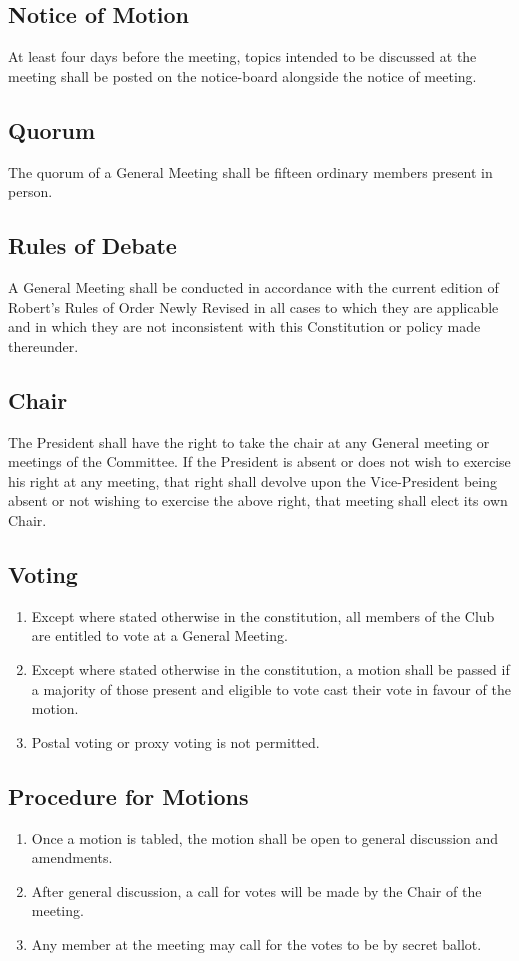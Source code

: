 \documentclass[11pt]{article} %
\begin{document}
\subsection{Notice of Motion}
At least four days before the meeting, topics intended to be discussed at the meeting shall be posted on the notice-board alongside the notice of meeting.
\subsection{Quorum}
The quorum of a General Meeting shall be fifteen ordinary members present in person.
\subsection{Rules of Debate}
A General Meeting shall be conducted in accordance with the current edition of Robert’s Rules of Order Newly Revised in all cases to which they are applicable and in which they are not inconsistent with this Constitution or policy made thereunder.
\subsection{Chair}
The President shall have the right to take the chair at any General meeting or meetings of the Committee. If the President is absent or does not wish to exercise his right at any meeting, that right shall devolve upon the Vice-President being absent or not wishing to exercise the above right, that meeting shall elect its own Chair.
\subsection{Voting}
\begin{enumerate}
	\item Except where stated otherwise in the constitution, all members of the Club are entitled to vote at a General Meeting.
	\item Except where stated otherwise in the constitution, a motion shall be passed if a majority of those present and eligible to vote cast their vote in favour of the motion.
	\item Postal voting or proxy voting is not permitted.
\end{enumerate}
\subsection{Procedure for Motions}
\begin{enumerate}
	\item Once a motion is tabled, the motion shall be open to general discussion and amendments.
	\item After general discussion, a call for votes will be made by the Chair of the meeting.
	\item Any member at the meeting may call for the votes to be by secret ballot.
\end{enumerate}
\end{document}
